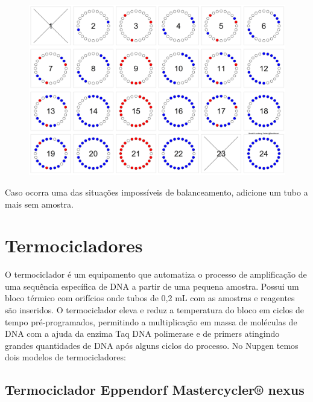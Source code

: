 \documentclass[
  letterpaper,
  DIV=11,
  numbers=noendperiod]{scrreprt}
\begin{document}
\begin{tcolorbox}[enhanced jigsaw, colback=white, toprule=.15mm, rightrule=.15mm, opacityback=0, left=2mm, arc=.35mm, bottomrule=.15mm, breakable, leftrule=.75mm]
\begin{minipage}[t]{\textwidth - 5.5mm}
\begin{figure}[H]

{\centering \includegraphics{figures/equipamentos/balanceamento_24.png}

}

\end{figure}

Caso ocorra uma das situações impossíveis de balanceamento, adicione um
tubo a mais sem amostra.

\end{minipage}%
\end{tcolorbox}

\hypertarget{termocicladores}{%
\section{Termocicladores}\label{termocicladores}}

O termociclador é um equipamento que automatiza o processo de
amplificação de uma sequência específica de DNA a partir de uma pequena
amostra. Possui um bloco térmico com orifícios onde tubos de 0,2 mL com
as amostras e reagentes são inseridos. O termociclador eleva e reduz a
temperatura do bloco em ciclos de tempo pré-programados, permitindo a
multiplicação em massa de moléculas de DNA com a ajuda da enzima Taq DNA
polimerase e de primers atingindo grandes quantidades de DNA após alguns
ciclos do processo. No Nupgen temos dois modelos de termocicladores:

\hypertarget{termociclador-eppendorf-mastercycler-nexus}{%
\subsection{Termociclador Eppendorf Mastercycler®
nexus}\label{termociclador-eppendorf-mastercycler-nexus}}
\end{document}
